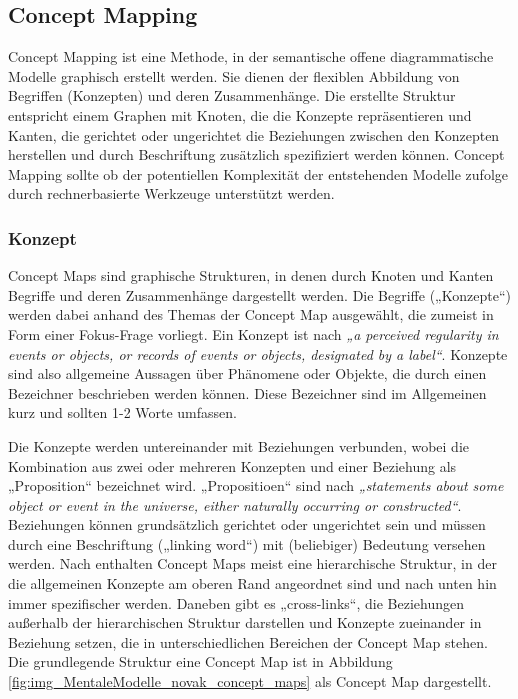 \subsection{Concept Mapping} %
\label{sub:concept_mapping}

Concept Mapping \citep{Novak06} ist eine Methode, in der semantische offene diagrammatische Modelle graphisch erstellt werden. Sie dienen der flexiblen Abbildung von Begriffen (Konzepten) und deren Zusammenhänge. Die erstellte Struktur entspricht einem Graphen mit Knoten, die die Konzepte repräsentieren und Kanten, die gerichtet oder ungerichtet die Beziehungen zwischen den Konzepten herstellen und durch Beschriftung zusätzlich spezifiziert werden können. Concept Mapping sollte ob der potentiellen Komplexität der entstehenden Modelle \citet{Novak06} zufolge durch rechnerbasierte Werkzeuge unterstützt werden. 

\subsubsection{Konzept}

Concept Maps sind graphische Strukturen, in denen durch Knoten und Kanten Begriffe und deren Zusammenhänge dargestellt werden. Die Begriffe („Konzepte“) werden dabei anhand des Themas der Concept Map ausgewählt, die zumeist in Form einer Fokus-Frage vorliegt. Ein Konzept ist nach \citep[][S. 1]{Novak06} \emph{„a perceived regularity in events or objects, or records of events or objects, designated by a label“}. Konzepte sind also allgemeine Aussagen über Phänomene oder Objekte, die durch einen Bezeichner beschrieben werden können. Diese Bezeichner sind im Allgemeinen kurz und sollten 1-2 Worte umfassen.

Die Konzepte werden untereinander mit Beziehungen verbunden, wobei die Kombination aus zwei oder mehreren Konzepten und einer Beziehung als „Proposition“ bezeichnet wird. „Propositioen“ sind nach \citet[][S. 1]{Novak06} \emph{„statements about some object or event in the universe, either naturally occurring or constructed“}. Beziehungen können grundsätzlich gerichtet oder ungerichtet sein und müssen durch eine Beschriftung („linking word“) mit (beliebiger) Bedeutung versehen werden. Nach \citet{Novak06} enthalten Concept Maps meist eine hierarchische Struktur, in der die allgemeinen Konzepte am oberen Rand angeordnet sind und nach unten hin immer spezifischer werden. Daneben gibt es „cross-links“, die Beziehungen außerhalb der hierarchischen Struktur darstellen und Konzepte zueinander in Beziehung setzen, die in unterschiedlichen Bereichen der Concept Map stehen. Die grundlegende Struktur eine Concept Map ist in Abbildung \ref{fig:img_MentaleModelle_novak_concept_maps} als Concept Map dargestellt.


